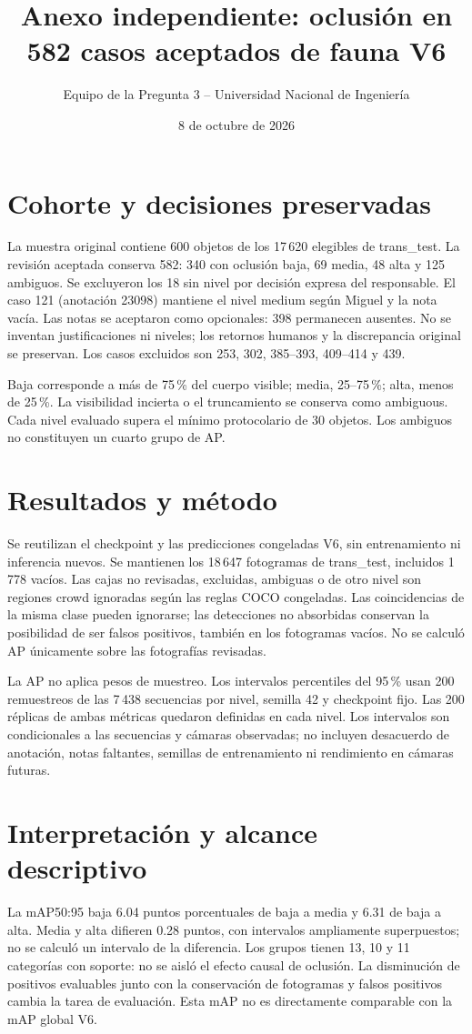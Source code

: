 \documentclass[10pt]{article}
\title{\large Anexo independiente: oclusión en 582 casos aceptados de fauna V6}
\author{Equipo de la Pregunta 3 -- Universidad Nacional de Ingeniería}
\date{8 de octubre de 2026}
\begin{document}
\maketitle

\section{Cohorte y decisiones preservadas}
La muestra original contiene 600 objetos de los 17\,620 elegibles de trans\_test.
La revisión aceptada conserva 582: 340 con oclusión baja, 69 media, 48 alta y
125 ambiguos. Se excluyeron los 18 sin nivel por decisión expresa del responsable.
El caso 121 (anotación 23098) mantiene el nivel medium según Miguel y la nota vacía.
Las notas se aceptaron como opcionales: 398 permanecen ausentes. No se inventan
justificaciones ni niveles; los retornos humanos y la discrepancia original se preservan.
Los casos excluidos son 253, 302, 385--393, 409--414 y 439.

Baja corresponde a más de 75\,\% del cuerpo visible; media, 25--75\,\%; alta,
menos de 25\,\%. La visibilidad incierta o el truncamiento se conserva como ambiguous.
Cada nivel evaluado supera el mínimo protocolario de 30 objetos. Los ambiguos
no constituyen un cuarto grupo de AP.

\section{Resultados y método}

Se reutilizan el checkpoint y las predicciones congeladas V6, sin entrenamiento
ni inferencia nuevos. Se mantienen los 18\,647 fotogramas de trans\_test, incluidos
1\,778 vacíos. Las cajas no revisadas, excluidas, ambiguas o de otro nivel son
regiones crowd ignoradas según las reglas COCO congeladas. Las coincidencias de
la misma clase pueden ignorarse; las detecciones no absorbidas conservan la
posibilidad de ser falsos positivos, también en los fotogramas vacíos.
No se calculó AP únicamente sobre las fotografías revisadas.

La AP no aplica pesos de muestreo. Los intervalos percentiles del 95\,\% usan
200 remuestreos de las 7\,438 secuencias por nivel, semilla 42 y checkpoint fijo.
Las 200 réplicas de ambas métricas quedaron definidas en cada nivel.
Los intervalos son condicionales a las secuencias y cámaras observadas; no
incluyen desacuerdo de anotación, notas faltantes, semillas de entrenamiento
ni rendimiento en cámaras futuras.

\medskip
\section{Interpretación y alcance descriptivo}
La mAP50:95 baja 6.04 puntos porcentuales de baja a media y 6.31 de baja a alta.
Media y alta difieren 0.28 puntos, con intervalos ampliamente superpuestos; no se
calculó un intervalo de la diferencia. Los grupos tienen 13, 10 y 11 categorías
con soporte: no se aisló el efecto causal de oclusión. La disminución de positivos
evaluables junto con la conservación de fotogramas y falsos positivos cambia
la tarea de evaluación. Esta mAP no es directamente comparable con la mAP global V6.
\end{document}
